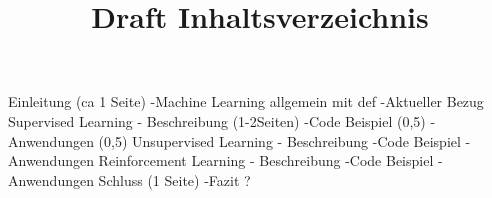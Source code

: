 \documentclass[10pt,a4paper]{article}
\begin{document}
	\title{Draft Inhaltsverzeichnis}
	Einleitung  (ca 1 Seite)
	-Machine Learning allgemein mit def
	-Aktueller Bezug
	Supervised Learning
	- Beschreibung  (1-2Seiten)
	-Code Beispiel	(0,5)
	- Anwendungen	(0,5)
	Unsupervised Learning
	- Beschreibung
	-Code Beispiel
	- Anwendungen
	Reinforcement Learning
	- Beschreibung
	-Code Beispiel
	- Anwendungen
	Schluss (1 Seite)
	-Fazit ?
\end{document}
